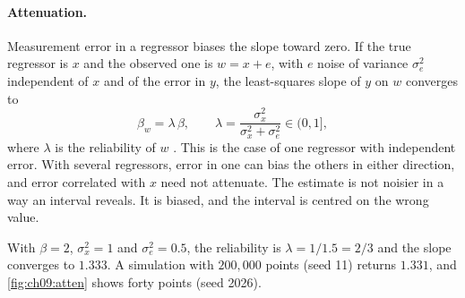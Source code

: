 \paragraph{Attenuation.} Measurement error in a regressor biases the slope toward zero. If the true regressor is $x$ and the observed one is $w=x+e$, with $e$ noise of variance $\sigma_e^2$ independent of $x$ and of the error in $y$, the least-squares slope of $y$ on $w$ converges to
\begin{equation}
\beta_w=\lambda\,\beta,\qquad \lambda=\frac{\sigma_x^2}{\sigma_x^2+\sigma_e^2}\in(0,1],
\label{eq:ch09:atten}
\end{equation}
where $\lambda$ is the reliability of $w$ \citep{fuller1987}. This is the case of one regressor with independent error. With several regressors, error in one can bias the others in either direction, and error correlated with $x$ need not attenuate. The estimate is not noisier in a way an interval reveals. It is biased, and the interval is centred on the wrong value.
\begin{example}\label{ex:ch09:atten}
With $\beta=2$, $\sigma_x^2=1$ and $\sigma_e^2=0.5$, the reliability is $\lambda=1/1.5=2/3$ and the slope converges to $1.333$. A simulation with $200{,}000$ points (seed 11) returns $1.331$, and \cref{fig:ch09:atten} shows forty points (seed 2026).
\end{example}

